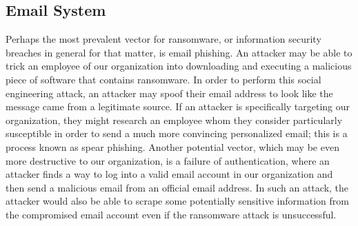 \documentclass[11pt]{article}
\begin{document}
\subsection{Email System}
\label{sec:orgd7a8443}
Perhaps the most prevalent vector for ransomware, or information security breaches in general for that matter, is email phishing. An attacker may be able to trick an employee of our organization into downloading and executing a malicious piece of software that contains ransomware. In order to perform this social engineering attack, an attacker may spoof their email address to look like the message came from a legitimate source. If an attacker is specifically targeting our organization, they might research an employee whom they consider particularly susceptible in order to send a much more convincing personalized email; this is a process known as spear phishing. Another potential vector, which may be even more destructive to our organization, is a failure of authentication, where an attacker finds a way to log into a valid email account in our organization and then send a malicious email from an official email address. In such an attack, the attacker would also be able to scrape some potentially sensitive information from the compromised email account even if the ransomware attack is unsuccessful.
\end{document}

